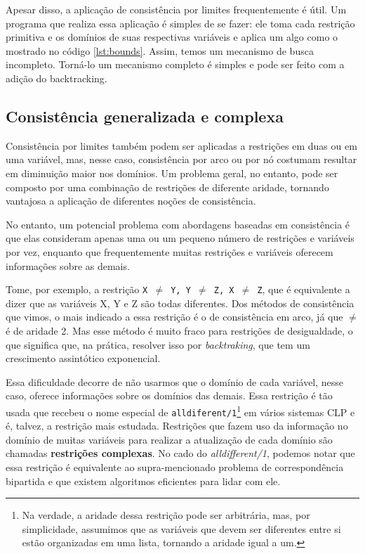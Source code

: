 \documentclass{article}
\begin{document}
Apesar disso, a aplicação de consistência por limites frequentemente é útil. Um programa que realiza essa aplicação é simples
de se fazer: ele toma cada restrição primitiva e os domínios de suas respectivas variáveis e aplica um algo como o mostrado no
código \ref{lst:bounds}. Assim, temos um mecanismo de busca incompleto. Torná-lo um mecanismo completo é simples e pode ser feito
com a adição do backtracking.


\subsection{Consistência generalizada e complexa}

Consistência por limites também podem ser aplicadas a restrições em duas ou em uma variável, mas, nesse caso, consistência por
arco ou por nó costumam resultar em diminuição maior nos domínios. Um problema geral, no entanto, pode ser composto por uma
combinação de restrições de diferente aridade, tornando vantajosa a aplicação de diferentes noções de consistência.

No entanto, um potencial problema com abordagens baseadas em consistência é que elas consideram apenas uma ou um pequeno número de
restrições e variáveis por vez, enquanto que frequentemente muitas restrições e variáveis oferecem informações sobre as demais.

Tome, por exemplo, a restrição {\tt X $\neq$ Y, Y $\neq$ Z, X $\neq$ Z}, que é equivalente a dizer que as variáveis X, Y e Z são todas
diferentes. Dos métodos de consistência que vimos, o mais indicado a essa restrição é o de consistência em arco, já que $\neq$ é
de aridade 2. Mas esse método é muito fraco para restrições de desigualdade, o que significa que, na prática, resolver isso
por \textit{backtraking}, que tem um crescimento assintótico exponencial.%

Essa dificuldade decorre de não usarmos que o domínio de cada variável, nesse caso, oferece informações sobre os domínios das
demais. Essa restrição é tão usada que recebeu o nome especial de {\tt alldiferent/1}\footnote{Na verdade, a aridade dessa restrição pode ser arbitrária, mas, por simplicidade, assumimos que as variáveis que devem ser diferentes entre si estão organizadas em uma lista, tornando a aridade igual a um.} em vários sistemas CLP e é, talvez, a restrição mais estudada.
Restrições que fazem uso da informação no domínio de muitas variáveis para realizar a atualização de cada domínio são
chamadas \textbf{restrições complexas}. No cado do \textit{alldifferent/1}, podemos notar que essa restrição é equivalente ao
supra-mencionado problema de correspondência bipartida e que existem algoritmos eficientes para lidar com ele.
\end{document}

